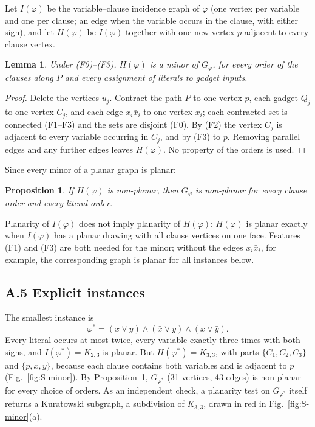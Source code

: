 \documentclass[aps,pre,onecolumn,superscriptaddress,nofootinbib]{revtex4-2}
\newtheorem{lemma}[theorem]{Lemma}
\newtheorem{proposition}[theorem]{Proposition}
\theoremstyle{remark}
\begin{document}
Let $I(\varphi)$ be the variable--clause incidence graph of $\varphi$ (one vertex per variable and
one per clause; an edge when the variable occurs in the clause, with either sign), and let
$H(\varphi)$ be $I(\varphi)$ together with one new vertex $p$ adjacent to every clause vertex.

\begin{lemma}\label{lem:S-minor}
Under (F0)--(F3), $H(\varphi)$ is a minor of $G_\varphi$, for every order of the clauses along $P$
and every assignment of literals to gadget inputs.
\end{lemma}

\begin{proof}
Delete the vertices $u_j$. Contract the path $P$ to one vertex $p$, each gadget $Q_j$ to one vertex
$C_j$, and each edge $x_i\bar x_i$ to one vertex $x_i$; each contracted set is connected (F1--F3)
and the sets are disjoint (F0). By (F2) the vertex $C_j$ is adjacent to every variable occurring in
$C_j$, and by (F3) to $p$. Removing parallel edges and any further edges leaves $H(\varphi)$. No
property of the orders is used.
\end{proof}

Since every minor of a planar graph is planar:

\begin{proposition}\label{prop:S-criterion}
If $H(\varphi)$ is non-planar, then $G_\varphi$ is non-planar for every clause order and every
literal order.
\end{proposition}

Planarity of $I(\varphi)$ does not imply planarity of $H(\varphi)$: $H(\varphi)$ is planar exactly
when $I(\varphi)$ has a planar drawing with all clause vertices on one face. Features (F1) and (F3)
are both needed for the minor; without the edges $x_i\bar x_i$, for example, the corresponding
graph is planar for all instances below.

\subsection*{A.5 Explicit instances}

The smallest instance is
\begin{equation}
\varphi^* = (x\vee y)\wedge(\bar x\vee y)\wedge(x\vee\bar y).
\end{equation}
Every literal occurs at most twice, every variable exactly three times with both signs, and
$I(\varphi^*)=K_{2,3}$ is planar. But $H(\varphi^*)=K_{3,3}$, with parts $\{C_1,C_2,C_3\}$ and
$\{p,x,y\}$, because each clause contains both variables and is adjacent to $p$
(Fig.~\ref{fig:S-minor}). By Proposition~\ref{prop:S-criterion}, $G_{\varphi^*}$ (31 vertices, 43
edges) is non-planar for every choice of orders. As an independent check, a planarity test on
$G_{\varphi^*}$ itself returns a Kuratowski subgraph, a subdivision of $K_{3,3}$, drawn in red in
Fig.~\ref{fig:S-minor}(a).
\end{document}
